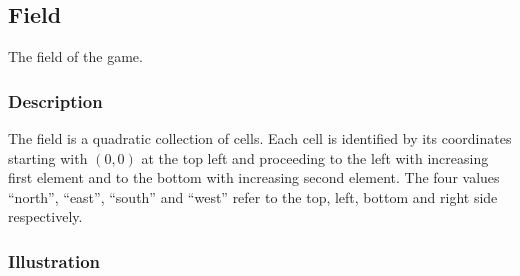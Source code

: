 \documentclass{scrartcl}
\begin{document}
\subsection{Field}
The field of the game.
\subsubsection{Description}
The field is a quadratic collection of cells. Each cell is identified by its 
coordinates starting with $(0,0)$ at the top left and proceeding to the left 
with increasing first element and to the bottom with increasing second element.
The four values \enquote{north}, \enquote{east}, \enquote{south} and 
\enquote{west} refer to the top, left, bottom and right side respectively.
\subsubsection{Illustration}
\end{document}
